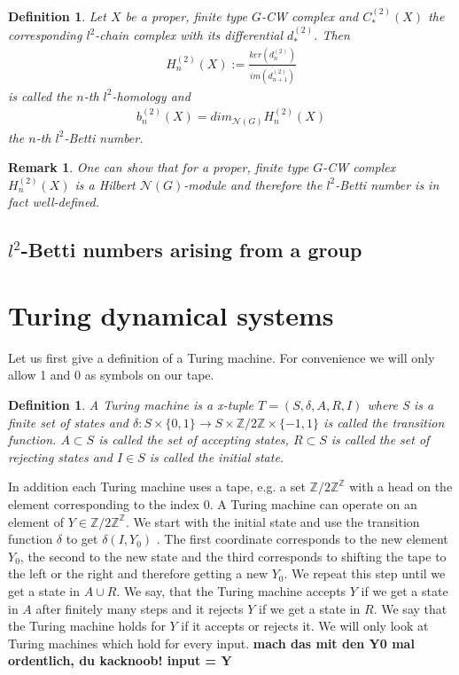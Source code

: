 \documentclass[12pt,a4paper]{scrartcl}
\newtheorem{Definition}[Theorem]{Definition}
\newtheorem{Remark}[Theorem]{Remark}
\numberwithin{equation}{section}
\newcommand{\Z}{\mathbb{Z}} %
\newcommand{\2}{\mathbb{Z} / 2 \mathbb{Z}}
\begin{document}
\begin{Definition}
	Let $X$ be a proper, finite type $G$-CW complex and $C_*^{(2)}(X)$ the corresponding $l^2$-chain complex with its differential $d_*^{(2)}$. Then 
	\begin{align*}
		H_n^{(2)}(X) := \frac{ker(d_n^{(2)})}{\overline{im(d_{n+1}^{(2)})}}
	\end{align*}
	is called the $n$-th $l^2$-homology and 
	\begin{align*}
		b_n^{(2)}(X)=dim_{\mathcal{N}(G)}H_n^{(2)}(X)
	\end{align*}
	the $n$-th $l^2$-Betti number.
\end{Definition}
\begin{Remark}
	One can show that for a proper, finite type $G$-CW complex $H_n^{(2)}(X)$ is a Hilbert $\mathcal{N}(G)$-module and therefore the $l^2$-Betti number is in fact well-defined.
\end{Remark}

\subsection{$l^2$-Betti numbers arising from a group}
\section{Turing dynamical systems}
Let us first give a definition of a Turing machine. For convenience we will only allow 1 and 0 as symbols on our tape.
\begin{Definition}
	A Turing machine is a x-tuple $T=(S,\delta, A, R, I)$ where S is a finite set of states and $\delta: S \times \{0,1\} \to S \times \2 \times \{-1, 1\}$ is called the transition function. $A \subset S$ is called the set of accepting states, $R \subset S$ is called the set of rejecting states and $I \in S$ is called the initial state.
\end{Definition}
In addition each Turing machine uses a tape, e.g. a set $\Z / 2\Z ^{\Z}$ with a head on the element corresponding to the index 0. A Turing machine can operate on an element of $Y \in \Z / 2\Z ^{\Z}$. We start with the initial state and use the transition function $\delta$ to get $\delta(I, Y_0)$ . The first coordinate corresponds to the new element $Y_0$, the second to the new state and the third corresponds to shifting the tape to the left or the right and therefore getting a new $Y_0$. We repeat this step until we get a state in $A \cup R$. We say, that the Turing machine accepts $Y$ if we get a state in $A$ after finitely many steps and it rejects $Y$ if we get a state in $R$. We say that the Turing machine holds for $Y$ if it accepts or rejects it. We will only look at Turing machines which hold for every input.
\textbf{mach das mit den Y0 mal ordentlich, du kacknoob! input = Y}
\end{document}
